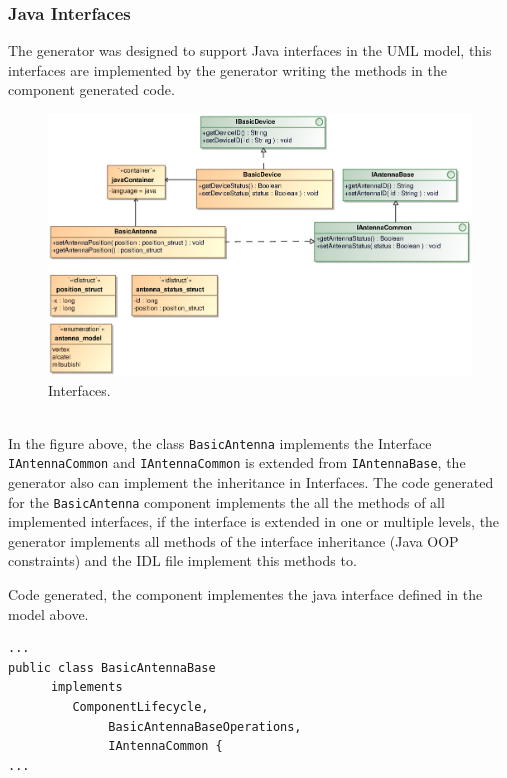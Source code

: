 \subsubsection{Java Interfaces}
The generator was designed to support Java interfaces in the UML model, this
interfaces are implemented by the generator writing the methods in the
component generated code.\\ 
\begin{figure}[h!t]
\begin{center}
\includegraphics[scale=0.8]{images/example3}
\caption{\label{fig:vs_diag}Interfaces.}
\end{center}
\end{figure}
\\
In the figure above, the class  \verb+BasicAntenna+ implements the Interface
\verb+IAntennaCommon+ and \verb+IAntennaCommon+ is extended from
\verb+IAntennaBase+, the generator also can implement the inheritance in
Interfaces. The code generated for the \verb+BasicAntenna+ component implements
the all the methods of all  implemented interfaces, if the interface is extended
in one or multiple levels, the generator implements all methods of the interface
inheritance (Java OOP constraints) and the IDL file implement this methods to.

Code generated, the component implementes the java interface defined in the
model above.
\begin{center}
\begin{verbatim}
...
public class BasicAntennaBase
      implements
         ComponentLifecycle,
              BasicAntennaBaseOperations,
              IAntennaCommon {
...
\end{verbatim}
\end{center}

